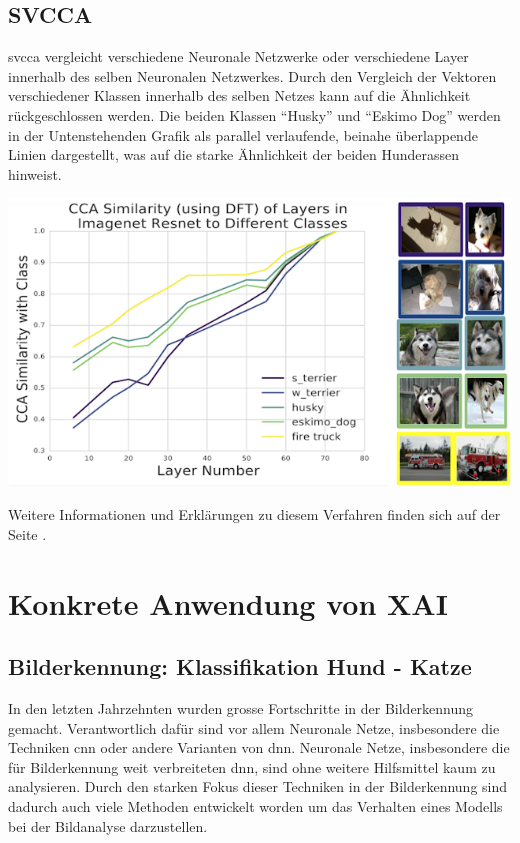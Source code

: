 \documentclass[
  12pt, %
  a4paper, %
  oneside, %
  openany, 
  numbers=noenddot, %
  BCOR=5mm, %
  parskip=half*, %
  thesis, %
]{bfhbook}
\begin{document}
\section{SVCCA}
\acrlong{svcca} \parencite{Raghu2017} vergleicht verschiedene Neuronale Netzwerke oder verschiedene Layer innerhalb des selben Neuronalen Netzwerkes.
\break
Durch den Vergleich der Vektoren verschiedener Klassen innerhalb des selben Netzes kann auf die Ähnlichkeit rückgeschlossen werden. Die beiden Klassen ``Husky'' und ``Eskimo Dog'' werden in der Untenstehenden Grafik als parallel verlaufende, beinahe überlappende Linien dargestellt, was auf die starke Ähnlichkeit der beiden Hunderassen hinweist.
\begin{center}
\begin{minipage}[t]{\linewidth}
 	\includegraphics[width=\textwidth]{Bilder/svcca-similarities.png}
\end{minipage}
\end{center}

Weitere Informationen und Erklärungen zu diesem Verfahren finden sich auf der Seite \parencite{svccaLink}.

\chapter{Konkrete Anwendung von XAI}

\section{Bilderkennung: Klassifikation Hund - Katze}

In den letzten Jahrzehnten wurden grosse Fortschritte in der Bilderkennung gemacht. Verantwortlich dafür sind vor allem Neuronale Netze, insbesondere die Techniken \acrfull{cnn} oder andere Varianten von \acrfull{dnn}. Neuronale Netze, insbesondere die für Bilderkennung weit verbreiteten \acrshort{dnn}, sind ohne weitere Hilfsmittel kaum zu analysieren.
Durch den starken Fokus dieser Techniken in der Bilderkennung sind dadurch auch viele Methoden entwickelt worden um das Verhalten eines Modells  bei der Bildanalyse darzustellen.
\end{document}
